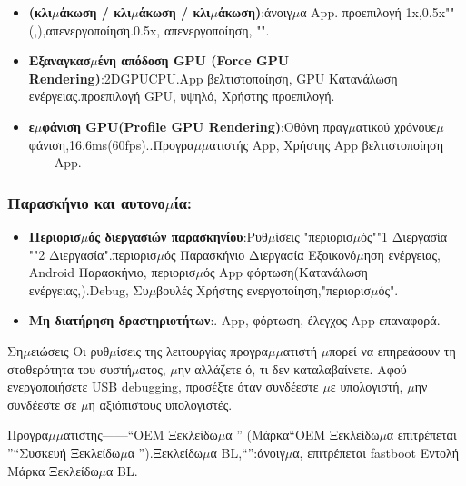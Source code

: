 \begin{itemize}
  \item \textbf{(κλι$\mu$άκωση / κλι$\mu$άκωση / κλι$\mu$άκωση)}:άνοιγ$\mu$α App. προεπιλογή 1x,0.5x"" (,),απενεργοποίηση.0.5x, απενεργοποίηση, "".
  \item \textbf{Εξαναγκασ$\mu$ένη απόδοση GPU (Force GPU Rendering)}:2DGPUCPU.App βελτιστοποίηση, GPU Κατανάλωση ενέργειας.προεπιλογή GPU, υψηλό, Χρήστης προεπιλογή.
  \item \textbf{ε$\mu$φάνιση GPU(Profile GPU Rendering)}:Οθόνη πραγ$\mu$ατικού χρόνουε$\mu$φάνιση,16.6ms(60fps)..Προγρα$\mu$$\mu$ατιστής App, Χρήστης App βελτιστοποίηση——App.
\end{itemize}

\subsubsection*{Παρασκήνιο και αυτονο$\mu$ία:}

\begin{itemize}
  \item \textbf{Περιορισ$\mu$ός διεργασιών παρασκηνίου}:Ρυθ$\mu$ίσεις "περιορισ$\mu$ός""1 Διεργασία ""2 Διεργασία".περιορισ$\mu$ός Παρασκήνιο Διεργασία Εξοικονό$\mu$ηση ενέργειας, Android Παρασκήνιο, περιορισ$\mu$ός App φόρτωση(Κατανάλωση ενέργειας,).Debug, Συ$\mu$βουλές Χρήστης ενεργοποίηση,"περιορισ$\mu$ός".
  \item \textbf{Μη διατήρηση δραστηριοτήτων}:. App, φόρτωση, έλεγχος App επαναφορά.
\end{itemize}

\begin{tcbwarn}{Ση$\mu$ειώσεις}
Οι ρυθ$\mu$ίσεις της λειτουργίας προγρα$\mu$$\mu$ατιστή $\mu$πορεί να επηρεάσουν τη σταθερότητα του συστή$\mu$ατος, $\mu$ην αλλάζετε ό, τι δεν καταλαβαίνετε. Αφού ενεργοποιήσετε USB debugging, προσέξτε όταν συνδέεστε $\mu$ε υπολογιστή, $\mu$ην συνδέεστε σε $\mu$η αξιόπιστους υπολογιστές.

\end{tcbwarn}


Προγρα$\mu$$\mu$ατιστής——“OEM Ξεκλείδω$\mu$α ” (Μάρκα“OEM Ξεκλείδω$\mu$α επιτρέπεται ”“Συσκευή Ξεκλείδω$\mu$α ”).Ξεκλείδω$\mu$α BL,“”:άνοιγ$\mu$α, επιτρέπεται fastboot Εντολή Μάρκα Ξεκλείδω$\mu$α BL.

